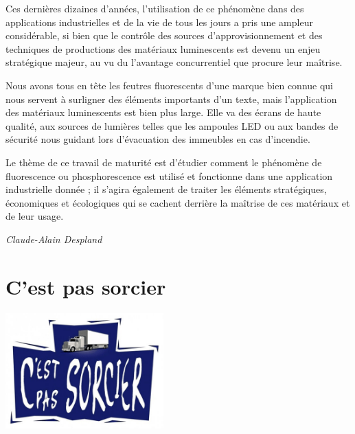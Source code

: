 \documentclass[
  10pt,
  french,
  a5paper,
  openany]{book}
\newenvironment{signature}{\begin{flushright}}{\end{flushright}}
\begin{document}
Ces dernières dizaines d'années, l'utilisation de ce phénomène dans des applications industrielles et de la vie de tous les jours a pris une ampleur considérable, si bien que le contrôle des sources d'approvisionnement et des techniques de productions des matériaux luminescents est devenu un enjeu stratégique majeur, au vu du l'avantage concurrentiel que procure leur maîtrise.

Nous avons tous en tête les feutres fluorescents d'une marque bien connue qui nous servent à surligner des éléments importants d'un texte, mais l'application des matériaux luminescents est bien plus large. Elle va des écrans de haute qualité, aux sources de lumières telles que les ampoules LED ou aux bandes de sécurité nous guidant lors d'évacuation des immeubles en cas d'incendie.

\clearpage

Le thème de ce travail de maturité est d'étudier comment le phénomène de fluorescence ou phosphorescence est utilisé et fonctionne dans une application industrielle donnée ; il s'agira également de traiter les éléments stratégiques, économiques et écologiques qui se cachent derrière la maîtrise de ces matériaux et de leur usage.

\begin{signature}
\emph{Claude-Alain Despland}

\end{signature}

\hypertarget{cest-pas-sorcier}{%
\chapter{C'est pas sorcier}\label{cest-pas-sorcier}}

\begin{center}
\includegraphics[width=\textwidth,height=12em]{images/cest-pas-sorcier.jpg}

\end{center}

\end{document}
